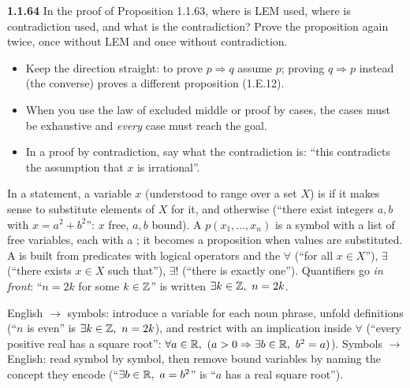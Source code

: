 \begin{trybox}[{1.1.64 \fO}]
\textbf{1.1.64} In the proof of Proposition 1.1.63, where is LEM used, where is contradiction used, and what is the contradiction? Prove the proposition again twice, once without LEM and once without contradiction.
\end{trybox}

\begin{warn}
\begin{itemize}
\item Keep the direction straight: to prove $p\Rightarrow q$ assume $p$; proving $q\Rightarrow p$ instead (the converse) proves a different proposition (1.E.12).
\item When you use the law of excluded middle or proof by cases, the cases must be exhaustive and \emph{every} case must reach the goal.
\item In a proof by contradiction, say what the contradiction is: ``this contradicts the assumption that $x$ is irrational''.
\end{itemize}
\end{warn}


\begin{key}[{Definitions 1.2.1, 1.2.2, 1.2.4}]
In a statement, a variable $x$ (understood to range over a set $X$) is  if it makes sense to substitute elements of $X$ for it, and  otherwise (``there exist integers $a,b$ with $x=a^2+b^2$'': $x$ free, $a,b$ bound). A  $p(x_1,\dots,x_n)$ is a symbol with a list of free variables, each with a ; it becomes a proposition when values are substituted. A  is built from predicates with logical operators and the  $\forall$ (``for all $x\in X$''), $\exists$ (``there exists $x\in X$ such that''), $\exists!$ (``there is exactly one''). Quantifiers go \emph{in front}: ``$n=2k$ for some $k\in\mathbb{Z}$'' is written $\exists k\in\mathbb{Z},\ n=2k$.
\end{key}

\begin{key}
English $\to$ symbols: introduce a variable for each noun phrase, unfold definitions (``$n$ is even'' is $\exists k\in\mathbb{Z},\ n=2k$), and restrict with an implication inside $\forall$ (``every positive real has a square root'': $\forall a\in\R,\ (a>0\Rightarrow\exists b\in\R,\ b^2=a)$). Symbols $\to$ English: read symbol by symbol, then remove bound variables by naming the concept they encode (``$\exists b\in\R,\ a=b^2$'' is ``$a$ has a real square root'').
\end{key}

